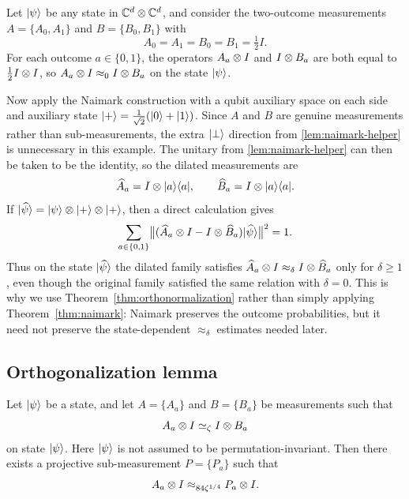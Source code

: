 \begin{remark}\label{ex:easy-but-long}
		Let $\lvert \psi \rangle$ be any state in $\mathbb{C}^d \otimes \mathbb{C}^d$, and consider the two-outcome measurements $A = \{A_0, A_1\}$ and $B = \{B_0, B_1\}$ with
		\[
			A_0 = A_1 = B_0 = B_1 = \tfrac{1}{2} I.
		\]
		For each outcome $a \in \{0,1\}$, the operators $A_a \otimes I$ and $I \otimes B_a$ are both equal to $\tfrac{1}{2} I \otimes I$, so $A_a \otimes I \approx_0 I \otimes B_a$ on the state $\lvert \psi \rangle$.

		Now apply the Naimark construction with a qubit auxiliary space on each side and auxiliary state $\lvert + \rangle = \tfrac{1}{\sqrt 2}(\lvert 0 \rangle+\lvert 1 \rangle)$. Since $A$ and $B$ are genuine measurements rather than sub-measurements, the extra $\lvert \bot \rangle$ direction from \ref{lem:naimark-helper} is unnecessary in this example. The unitary from \ref{lem:naimark-helper} can then be taken to be the identity, so the dilated measurements are
		\[
			\widehat A_a = I \otimes \lvert a \rangle\langle a \rvert, \qquad \widehat B_a = I \otimes \lvert a \rangle\langle a \rvert.
		\]
		If $\lvert \widehat{\psi} \rangle = \lvert \psi \rangle \otimes \lvert + \rangle \otimes \lvert + \rangle$, then a direct calculation gives
		\[
			\sum_{a \in \{0,1\}} \bigl\lVert (\widehat A_a \otimes I - I \otimes \widehat B_a) \lvert \widehat{\psi} \rangle \bigr\rVert^2 = 1.
		\]
		Thus on the state $\lvert \widehat{\psi} \rangle$ the dilated family satisfies $\widehat A_a \otimes I \approx_\delta I \otimes \widehat B_a$ only for $\delta \ge 1$, even though the original family satisfied the same relation with $\delta = 0$. This is why we use Theorem~\ref{thm:orthonormalization} rather than simply applying Theorem~\ref{thm:naimark}: Naimark preserves the outcome probabilities, but it need not preserve the state-dependent $\approx_\delta$ estimates needed later.
\end{remark}

\subsection{Orthogonalization lemma}\label{sec:orthogonalization}

\begin{lemma}\label{lem:orthonormalization-main-lemma}
	\leanok
	Let $\lvert \psi \rangle$ be a state, and let $A = \{A_a\}$ and $B = \{B_a\}$ be measurements such that
	\[
		A_a \otimes I \simeq_\zeta I \otimes B_a
	\]
	on state $\lvert \psi \rangle$. Here $\lvert \psi \rangle$ is not assumed to be permutation-invariant.
	Then there exists a projective sub-measurement $P = \{P_a\}$ such that
	\[
		A_a \otimes I \approx_{84 \zeta^{1/4}} P_a \otimes I.
	\]
\end{lemma}

